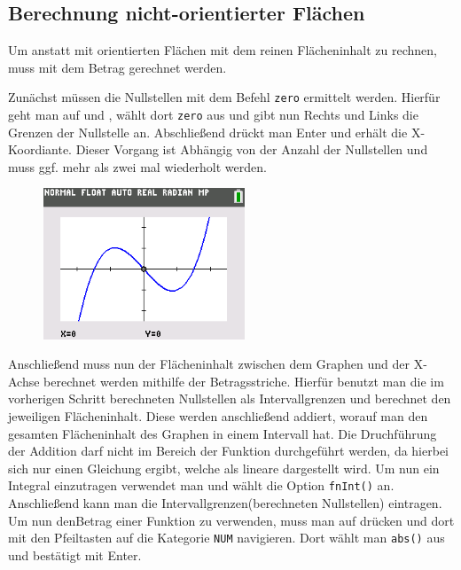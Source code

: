 \subsection{Berechnung nicht-orientierter Flächen}
Um anstatt mit orientierten Flächen mit dem reinen Flächeninhalt zu rechnen, muss mit dem Betrag gerechnet werden.
\begin{paracol}{2}
\begin{flushleft}
	Zunächst müssen die Nullstellen mit dem Befehl \texttt{zero} ermittelt werden. Hierfür geht man auf  und , wählt dort \texttt{zero} aus und gibt nun Rechts und Links die Grenzen der Nullstelle an. Abschließend drückt man Enter und erhält die X-Koordiante. Dieser Vorgang ist Abhängig von der Anzahl der Nullstellen und muss ggf. mehr als zwei mal wiederholt werden. 
\end{flushleft}	
\switchcolumn
\begin{flushright}
	\begin{figure}
		\includegraphics[width=6cm]{Media/GRT/Visualisierung/berechnung_nichtOrientierter_Flacheninhalt/berechnung_nichtOrientierter_Flacheninhalt_1.png}
		\caption{}

	\end{figure}
	\end{flushright}
\end{paracol}
Anschließend muss nun der Flächeninhalt zwischen dem Graphen und der X-Achse berechnet werden mithilfe der Betragsstriche. Hierfür benutzt man die im vorherigen Schritt berechneten Nullstellen als Intervallgrenzen und berechnet den jeweiligen Flächeninhalt. Diese werden anschließend addiert, worauf man den gesamten Flächeninhalt des Graphen in einem Intervall hat. 
	Die Druchführung der Addition darf nicht im Bereich der Funktion durchgeführt werden, da hierbei sich nur einen Gleichung ergibt, welche als lineare dargestellt wird. Um nun ein Integral einzutragen verwendet man  und wählt die Option \texttt{fnInt()} an. Anschließend kann man die Intervallgrenzen(berechneten Nullstellen) eintragen. Um nun denBetrag einer Funktion zu verwenden, muss man auf  drücken und dort mit den Pfeiltasten auf die Kategorie \texttt{NUM} navigieren. Dort wählt man \texttt{abs()} aus und bestätigt mit Enter. 
\pagebreak
